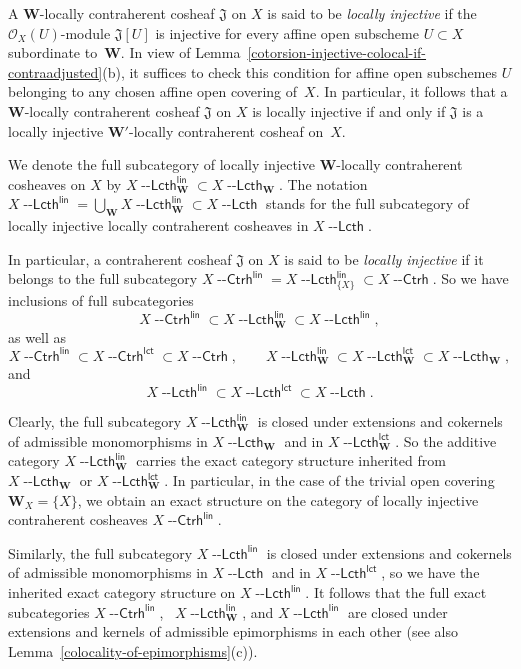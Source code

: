 \documentclass[12pt,a4paper]{amsart}
\newcommand{\+}{\nobreakdash-}
\renewcommand{\:}{\colon}
\newcommand{\Ctrh}{{\operatorname{\mathsf{--Ctrh}}}}
\newcommand{\Lcth}{{\operatorname{\mathsf{--Lcth}}}}
\newcommand{\lct}{\mathsf{lct}}
\newcommand{\lin}{\mathsf{lin}}
\newcommand{\bW}{\mathbf W}
\newcommand{\cO}{\mathcal O}
\newcommand{\fJ}{\mathfrak J}
\theoremstyle{plain}
\theoremstyle{definition}
\begin{document}
 A $\bW$\+locally contraherent cosheaf $\fJ$ on $X$ is said to be
\emph{locally injective} if the $\cO_X(U)$\+module $\fJ[U]$ is
injective for every affine open subscheme $U\subset X$ subordinate
to~$\bW$.
 In view of
Lemma~\ref{cotorsion-injective-colocal-if-contraadjusted}(b), it
suffices to check this condition for affine open subschemes $U$
belonging to any chosen affine open covering of~$X$.
 In particular, it follows that a $\bW$\+locally contraherent cosheaf
$\fJ$ on $X$ is locally injective if and only if $\fJ$ is a locally
injective $\bW'$\+locally contraherent cosheaf on~$X$.

 We denote the full subcategory of locally injective $\bW$\+locally
contraherent cosheaves on $X$ by $X\Lcth^\lin_\bW\subset X\Lcth_\bW$.
 The notation $X\Lcth^\lin=\bigcup_\bW X\Lcth^\lin_\bW\allowbreak
\subset X\Lcth$ stands for the full subcategory of locally injective
locally contraherent cosheaves in $X\Lcth$.  {\par}

 In particular, a contraherent cosheaf $\fJ$ on $X$ is said to be
\emph{locally injective} if it belongs to the full subcategory
$X\Ctrh^\lin=X\Lcth^\lin_{\{X\}}\subset X\Ctrh$.
 So we have inclusions of full subcategories
$$
  X\Ctrh^\lin\subset X\Lcth^\lin_\bW\subset X\Lcth^\lin,
$$
as well as
$$
 X\Ctrh^\lin\subset X\Ctrh^\lct\subset X\Ctrh, \qquad
 X\Lcth^\lin_\bW\subset X\Lcth^\lct_\bW\subset X\Lcth_\bW,
$$
and
$$
 X\Lcth^\lin\subset X\Lcth^\lct\subset X\Lcth.
$$

 Clearly, the full subcategory $X\Lcth^\lin_\bW$ is closed under
extensions and cokernels of admissible monomorphisms in $X\Lcth_\bW$
and in $X\Lcth_\bW^\lct$.
 So the additive category $X\Lcth^\lin_\bW$ carries the exact
category structure inherited from $X\Lcth_\bW$ or $X\Lcth^\lct_\bW$.
 In particular, in the case of the trivial open covering
$\bW_X=\{X\}$, we obtain an exact structure on the category of
locally injective contraherent cosheaves $X\Ctrh^\lin$.

 Similarly, the full subcategory $X\Lcth^\lin$ is closed under
extensions and cokernels of admissible monomorphisms in $X\Lcth$
and in $X\Lcth^\lct$, so we have the inherited exact category
structure on $X\Lcth^\lin$.
 It follows that the full exact subcategories $X\Ctrh^\lin$, \
$X\Lcth^\lin_\bW$, and $X\Lcth^\lin$ are closed under extensions
and kernels of admissible epimorphisms in each other (see
also Lemma~\ref{colocality-of-epimorphisms}(c)).
\end{document}
